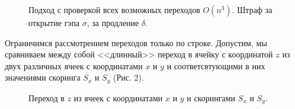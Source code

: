 \documentclass[letterpaper, 11pt]{article}
\begin{document}
\begin{figure}[H]
  \caption{Подход с проверкой всех возможных переходов $O(n^3)$. Штраф за открытие гэпа $\sigma$, за продление $\delta$.}
\end{figure}

Ограничимся рассмотрением переходов только по строке. Допустим, мы сравниваем между собой <<длинный>> переход в ячейку с координатой $z$ из двух различных ячеек с координатами $x$ и $y$ и соответсвтующими в них значениями скоринга $S_x$ и $S_y$ (Рис. 2).

\begin{figure}[H]
  \caption{Переход в $z$ из ячеек с координатами $x$ и $y$ и скорингами $S_x$ и $S_y$.}
\end{figure}
\end{document}
